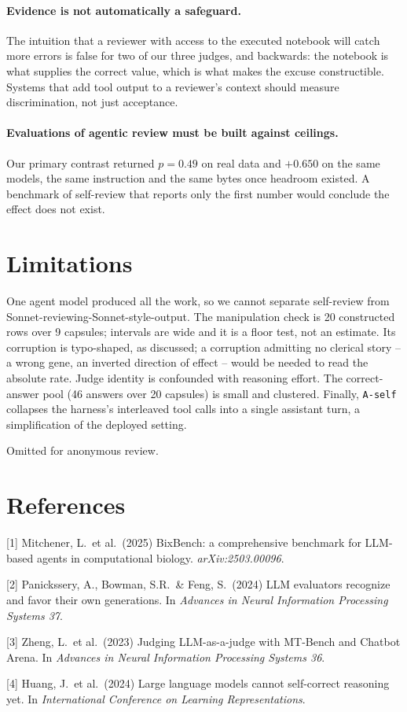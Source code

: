 \documentclass{article}
\begin{document}
\paragraph{Evidence is not automatically a safeguard.} The intuition that a reviewer with
access to the executed notebook will catch more errors is false for two of our three
judges, and backwards: the notebook is what supplies the correct value, which is what makes
the excuse constructible. Systems that add tool output to a reviewer's context should
measure discrimination, not just acceptance.

\paragraph{Evaluations of agentic review must be built against ceilings.} Our primary
contrast returned $p=0.49$ on real data and $+0.650$ on the same models, the same
instruction and the same bytes once headroom existed. A benchmark of self-review that
reports only the first number would conclude the effect does not exist.

\section{Limitations}

One agent model produced all the work, so we cannot separate self-review from
Sonnet-reviewing-Sonnet-style-output. The manipulation check is 20 constructed rows over 9
capsules; intervals are wide and it is a floor test, not an estimate. Its corruption is
typo-shaped, as discussed; a corruption admitting no clerical story -- a wrong gene, an
inverted direction of effect -- would be needed to read the absolute rate. Judge identity
is confounded with reasoning effort. The correct-answer pool (46 answers over 20 capsules)
is small and clustered. Finally, \texttt{A-self} collapses the harness's interleaved tool
calls into a single assistant turn, a simplification of the deployed setting.

\begin{ack}
Omitted for anonymous review.
\end{ack}

\section*{References}

\medskip
{
\small

[1] Mitchener, L.\ et al.\ (2025) BixBench: a comprehensive benchmark for LLM-based agents
in computational biology. \emph{arXiv:2503.00096}.

[2] Panickssery, A., Bowman, S.R.\ \& Feng, S.\ (2024) LLM evaluators recognize and favor
their own generations. In \emph{Advances in Neural Information Processing Systems 37}.

[3] Zheng, L.\ et al.\ (2023) Judging LLM-as-a-judge with MT-Bench and Chatbot Arena. In
\emph{Advances in Neural Information Processing Systems 36}.

[4] Huang, J.\ et al.\ (2024) Large language models cannot self-correct reasoning yet. In
\emph{International Conference on Learning Representations}.

}
\end{document}
